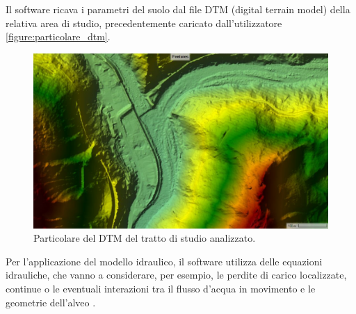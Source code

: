 Il software ricava i parametri del suolo dal file DTM (digital terrain model) della relativa area di studio, precedentemente caricato dall'utilizzatore \eqref{figure:particolare_dtm}.

\begin{figure}[htb] \centering
    \includegraphics[scale=0.3]{immagini/particolare_dtm.JPG}
    \caption{Particolare del DTM del tratto di studio analizzato.}
    \label{figure:particolare_dtm}
    \end{figure}

Per l'applicazione del modello idraulico, il software utilizza delle equazioni idrauliche, che vanno a considerare, per esempio, le perdite di carico localizzate, continue o le eventuali interazioni tra il flusso d'acqua in movimento e le geometrie dell'alveo \cite{hydraulic_equations}.

